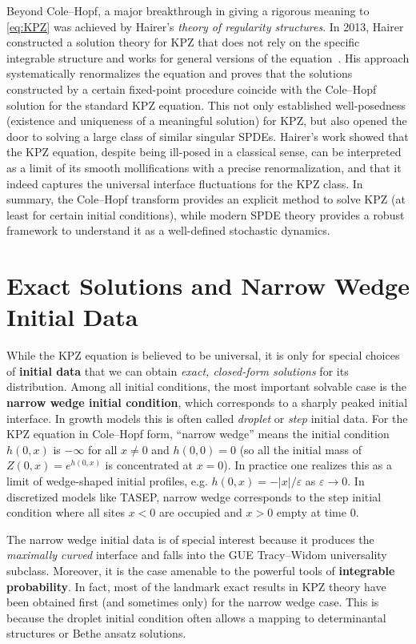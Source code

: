\documentclass[letterpaper,11pt,oneside,reqno]{article}
\numberwithin{equation}{section}
\theoremstyle{definition}
\begin{document}
Beyond Cole–Hopf, a major breakthrough in giving a rigorous meaning to \eqref{eq:KPZ} was achieved by Hairer’s \emph{theory of regularity structures}. In 2013, Hairer constructed a solution theory for KPZ that does not rely on the specific integrable structure and works for general versions of the equation \cite{Hairer11}. His approach systematically renormalizes the equation and proves that the solutions constructed by a certain fixed-point procedure coincide with the Cole–Hopf solution for the standard KPZ equation. This not only established well-posedness (existence and uniqueness of a meaningful solution) for KPZ, but also opened the door to solving a large class of similar singular SPDEs. Hairer’s work showed that the KPZ equation, despite being ill-posed in a classical sense, can be interpreted as a limit of its smooth mollifications with a precise renormalization, and that it indeed captures the universal interface fluctuations for the KPZ class. In summary, the Cole–Hopf transform provides an explicit method to solve KPZ (at least for certain initial conditions), while modern SPDE theory provides a robust framework to understand it as a well-defined stochastic dynamics.

\section{Exact Solutions and Narrow Wedge Initial Data}
While the KPZ equation is believed to be universal, it is only for special choices of \textbf{initial data} that we can obtain \emph{exact, closed-form solutions} for its distribution. Among all initial conditions, the most important solvable case is the \textbf{narrow wedge initial condition}, which corresponds to a sharply peaked initial interface. In growth models this is often called \emph{droplet} or \emph{step} initial data. For the KPZ equation in Cole–Hopf form, “narrow wedge” means the initial condition $h(0,x)$ is $-\infty$ for all $x\neq 0$ and $h(0,0)=0$ (so all the initial mass of $Z(0,x)=e^{h(0,x)}$ is concentrated at $x=0$). In practice one realizes this as a limit of wedge-shaped initial profiles, e.g. $h(0,x) = -|x|/\varepsilon$ as $\varepsilon\to0$. In discretized models like TASEP, narrow wedge corresponds to the step initial condition where all sites $x<0$ are occupied and $x>0$ empty at time $0$.

The narrow wedge initial data is of special interest because it produces the \emph{maximally curved} interface and falls into the GUE Tracy–Widom universality subclass. Moreover, it is the case amenable to the powerful tools of \textbf{integrable probability}. In fact, most of the landmark exact results in KPZ theory have been obtained first (and sometimes only) for the narrow wedge case. This is because the droplet initial condition often allows a mapping to determinantal structures or Bethe ansatz solutions.
\end{document}
